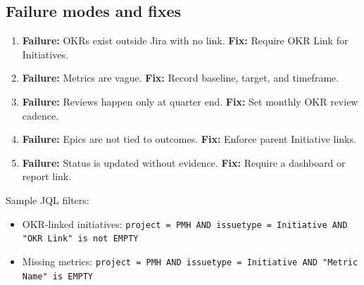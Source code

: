 \subsection{Failure modes and fixes}
\begin{enumerate}
  \item \textbf{Failure:} OKRs exist outside Jira with no link. \textbf{Fix:} Require OKR Link for Initiatives.
  \item \textbf{Failure:} Metrics are vague. \textbf{Fix:} Record baseline, target, and timeframe.
  \item \textbf{Failure:} Reviews happen only at quarter end. \textbf{Fix:} Set monthly OKR review cadence.
  \item \textbf{Failure:} Epics are not tied to outcomes. \textbf{Fix:} Enforce parent Initiative links.
  \item \textbf{Failure:} Status is updated without evidence. \textbf{Fix:} Require a dashboard or report link.
\end{enumerate}

Sample JQL filters:
\begin{itemize}
  \item OKR-linked initiatives: \texttt{project = PMH AND issuetype = Initiative AND "OKR Link" is not EMPTY}
  \item Missing metrics: \texttt{project = PMH AND issuetype = Initiative AND "Metric Name" is EMPTY}
\end{itemize}










